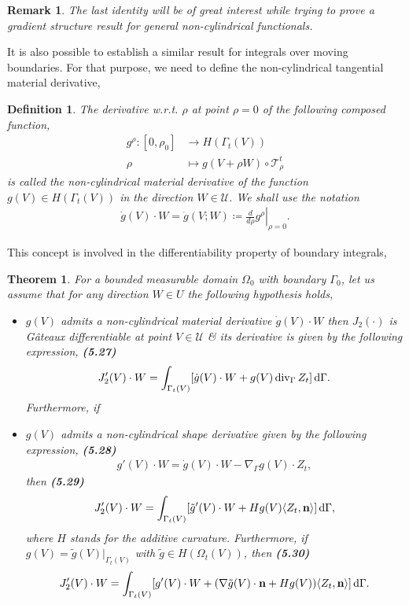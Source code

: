 \documentclass[oneside]{book}
\numberwithin{equation}{section}
\newtheorem{definition}{Definition}[chapter]
\newtheorem{remark}{Remark}[chapter]
\newtheorem{theorem}{Theorem}[chapter]
\begin{document}
\begin{remark}
	The last identity will be of great interest while trying to prove a gradient structure result for general non-cylindrical functionals.
\end{remark}
It is also possible to establish a similar result for integrals over moving boundaries. For that purpose, we need to define the non-cylindrical tangential material derivative,

\begin{definition}
	The derivative w.r.t. $\rho$ at point $\rho = 0$ of the following composed function,
	\begin{align*}
		g^\rho:[0,\rho_0]&\to H(\Gamma_t(V))\\
		\rho&\mapsto g(V + \rho W)\circ\mathcal{T}_\rho^t
	\end{align*}
	is called the \emph{non-cylindrical material derivative} of the function $g(V)\in H(\Gamma_t(V))$ in the direction $W\in\mathcal{U}$. We shall use the notation
	\begin{align*}
		\dot{g}(V)\cdot W = \dot{g}(V;W)\coloneqq\left.\frac{d}{d\rho}g^\rho\right|_{\rho = 0}.
	\end{align*}
\end{definition}
This concept is involved in the differentiability property of boundary integrals,

\begin{theorem}
	For a bounded measurable domain $\Omega_0$ with boundary $\Gamma_0$, let us assume that for any direction $W\in U$ the following hypothesis holds,
	\begin{itemize}
		\item[(i)] $g(V)$ admits a non-cylindrical material derivative $\dot{g}(V)\cdot W$ then $J_2(\cdot)$ is G\^ateaux differentiable at point $V\in\mathcal{U}$ \& its derivative is given by the following expression, \textbf{(5.27)}
		\begin{align*}
			J_2'(V)\cdot W = \int_{\Gamma_t(V)} [\dot{g}(V)\cdot W + g(V)\operatorname{div}_\Gamma Z_t]\,{\rm d}\Gamma.
		\end{align*}
		Furthermore, if
		\item[(ii)] $g(V)$ admits a non-cylindrical shape derivative given by the following expression, \textbf{(5.28)}
		\begin{align*}
			g'(V)\cdot W = \dot{g}(V)\cdot W - \nabla_\Gamma g(V)\cdot Z_t,
		\end{align*}
		then \textbf{(5.29)}
		\begin{align*}
			J_2'(V)\cdot W = \int_{\Gamma_t(V)} [\tilde{g}'(V)\cdot W + Hg(V)\langle Z_t,{\bf n}\rangle]\,{\rm d}\Gamma,
		\end{align*}
		where $H$ stands for the additive curvature. Furthermore, if $g(V) = \tilde{g}(V)|_{\Gamma_t(V)}$ with $\tilde{g}\in H(\Omega_t(V))$, then \textbf{(5.30)}
		\begin{align*}
			J_2'(V)\cdot W = \int_{\Gamma_t(V)} [g'(V)\cdot W + (\nabla\tilde{g}(V)\cdot{\bf n} + Hg(V))\langle Z_t,{\bf n}\rangle]\,{\rm d}\Gamma.
		\end{align*}
	\end{itemize}
\end{theorem}
\end{document}
